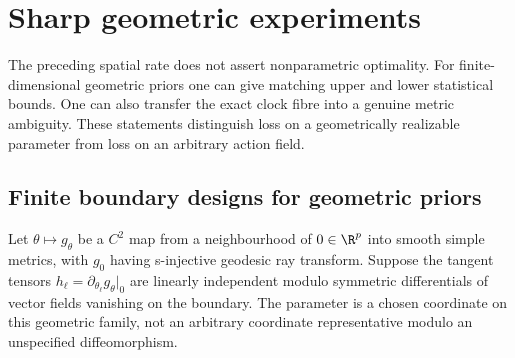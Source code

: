 \section{Sharp geometric experiments}
\label{sec:v85-sharp-geometry}
The preceding spatial rate does not assert nonparametric optimality.
For finite-dimensional geometric priors one can give matching upper
and lower statistical bounds. One can also transfer the exact clock
fibre into a genuine metric ambiguity. These statements distinguish
loss on a geometrically realizable parameter from loss on an arbitrary
action field.

\subsection{Finite boundary designs for geometric priors}
Let $\theta\mapsto g_\theta$ be a $C^2$ map from a neighbourhood of
$0\in\R^p$ into smooth simple metrics, with $g_0$ having s-injective
geodesic ray transform. Suppose the tangent tensors
$h_\ell=\partial_{\theta_\ell}g_\theta|_0$ are linearly independent
modulo symmetric differentials of vector fields vanishing on the
boundary. The parameter is a chosen coordinate on this geometric
family, not an arbitrary coordinate representative modulo an
unspecified diffeomorphism.

